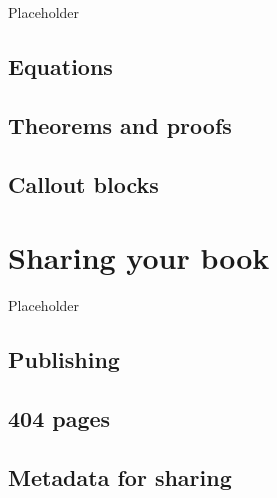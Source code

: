 \documentclass[
]{book}
\begin{document}
Placeholder

\section{Equations}\label{equations}

\section{Theorems and proofs}\label{theorems-and-proofs}

\section{Callout blocks}\label{callout-blocks}

\chapter{Sharing your book}\label{sharing-your-book}

Placeholder

\section{Publishing}\label{publishing}

\section{404 pages}\label{pages}

\section{Metadata for sharing}\label{metadata-for-sharing}
\end{document}

